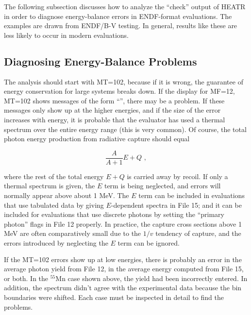 The following subsection discusses how to analyze the ``check''
output of HEATR in order to diagnose energy-balance errors in
ENDF-format evaluations.  The examples are drawn from ENDF/B-V
testing\cite{ebal}.  In general, results like these are less likely to occur
in modern evaluations.

\subsection{Diagnosing Energy-Balance Problems}
\label{ssHEATR_EB_Prob}

The analysis should start with MT=102, because if it is wrong, the
guarantee of energy conservation  for large systems breaks
down.  If the display for MF=12, MT=102 shows messages of the form
``'', there may be a problem.  If these messages only
show up at the higher energies, and if the size of the error
increases with energy, it is probable that the evaluator has
used a thermal spectrum over the entire energy range (this is
very common).  Of course, the total photon energy production
from radiative capture should equal

\begin{equation}
   \frac{A}{A+1}E+Q\,\,,
\end{equation}

\noindent
where the rest of the total energy $E{+}Q$ is carried away by
recoil.  If only a thermal spectrum is given, the $E$ term is
being neglected, and errors will normally appear above about
1 MeV.  The $E$ term can be included in evaluations that use
tabulated data by giving $E$-dependent spectra in File 15; and it
can be included for evaluations that use discrete photons
by setting the ``primary photon'' flags in File 12
properly.  In practice, the capture cross sections above 1 MeV
are often comparatively small due to the $1/v$ tendency of
capture, and the errors introduced by
neglecting the $E$ term can be ignored.

If the MT=102 errors show up at low energies, there is probably
an error in the average photon yield from File 12, in the
average energy computed from File 15, or both.  In the
$^{55}$Mn case shown above, the yield had been incorrectly
entered.  In addition, the spectrum didn't agree with the
experimental data because the bin boundaries were shifted.
Each case must be inspected in detail to find the problems.

